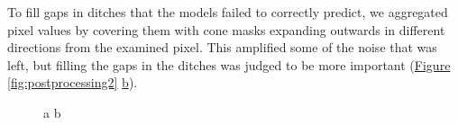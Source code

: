 \documentclass[11pt, review]{elsarticle} %
\begin{document}
To fill gaps in ditches that the models failed to correctly predict, we aggregated pixel values by covering them with cone masks expanding outwards in different directions from the examined pixel. This amplified some of the noise that was left, but filling the gaps in the ditches was judged to be more important (\hyperref[fig:postprocessing2]{Figure} \ref{fig:postprocessing2} \hyperref[fig:postprocessing2]{b}).

\begin{figure} [H]
    \centering
    a{
        }\hspace{5pt}
    b{
}
\end{figure}
\end{document}
